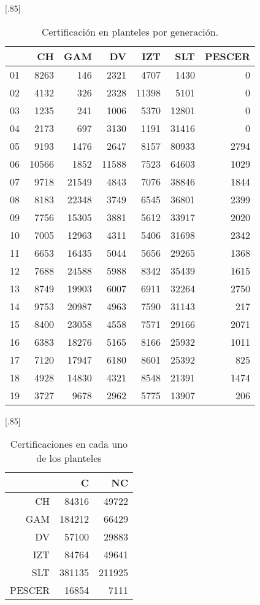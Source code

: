 \documentclass[12pt]{article}
\begin{document}
\begin{table}[ht]
\centering
\scalebox{0.75}[.85]{
\begin{tabular}{rrrrrrr}
  \hline
 & CH & GAM & DV & IZT & SLT & PESCER \\ 
  \hline
01 & 8263 & 146 & 2321 & 4707 & 1430 &   0 \\ 
  02 & 4132 & 326 & 2328 & 11398 & 5101 &   0 \\ 
  03 & 1235 & 241 & 1006 & 5370 & 12801 &   0 \\ 
  04 & 2173 & 697 & 3130 & 1191 & 31416 &   0 \\ 
  05 & 9193 & 1476 & 2647 & 8157 & 80933 & 2794 \\ 
  06 & 10566 & 1852 & 11588 & 7523 & 64603 & 1029 \\ 
  07 & 9718 & 21549 & 4843 & 7076 & 38846 & 1844 \\ 
  08 & 8183 & 22348 & 3749 & 6545 & 36801 & 2399 \\ 
  09 & 7756 & 15305 & 3881 & 5612 & 33917 & 2020 \\ 
  10 & 7005 & 12963 & 4311 & 5406 & 31698 & 2342 \\ 
  11 & 6653 & 16435 & 5044 & 5656 & 29265 & 1368 \\ 
  12 & 7688 & 24588 & 5988 & 8342 & 35439 & 1615 \\ 
  13 & 8749 & 19903 & 6007 & 6911 & 32264 & 2750 \\ 
  14 & 9753 & 20987 & 4963 & 7590 & 31143 & 217 \\ 
  15 & 8400 & 23058 & 4558 & 7571 & 29166 & 2071 \\ 
  16 & 6383 & 18276 & 5165 & 8166 & 25932 & 1011 \\ 
  17 & 7120 & 17947 & 6180 & 8601 & 25392 & 825 \\ 
  18 & 4928 & 14830 & 4321 & 8548 & 21391 & 1474 \\ 
  19 & 3727 & 9678 & 2962 & 5775 & 13907 & 206 \\ 
   \hline
\end{tabular}}
\caption{\label{Cert_Gen_Plantel}Certificaci\'on en planteles por generaci\'on.}
\end{table}

\begin{table}[ht!]
\centering
\scalebox{0.75}[.85]{
\begin{tabular}{rrr}
  \hline
 & C & NC \\ 
  \hline
CH & 84316 & 49722 \\ 
  GAM & 184212 & 66429 \\ 
  DV & 57100 & 29883 \\ 
  IZT & 84764 & 49641 \\ 
  SLT & 381135 & 211925 \\ 
  PESCER & 16854 & 7111 \\ 
   \hline
\end{tabular}}
\caption{\label{Prob_Cert_Plantel}Certificaciones en cada uno de los planteles}
\end{table}
\end{document}
